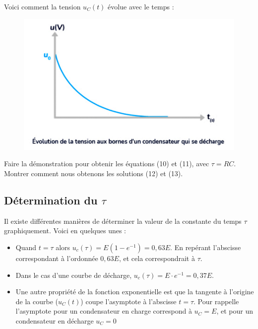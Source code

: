 \documentclass[11pt,a4paper]{article}
\begin{document}
Voici comment la tension $u_C(t)$ évolue avec le temps : 

\begin{figure}[H]
    \centering
    \includegraphics[width=0.7\linewidth]{imgs/p7/courbeDecharge.png.jpg}
\end{figure}

\begin{exo}   %
Faire la démonstration pour obtenir les équations (10) et (11), avec $\tau = RC$. Montrer comment nous obtenons les solutions (12) et (13). 
\vspace{10cm}
\end{exo}

\subsection{Détermination du $\tau$}

Il existe différentes manières de déterminer la valeur de la constante du temps $\tau$ graphiquement. Voici en quelques unes : 
\begin{itemize}
    \item Quand $t=\tau$ alors $u_c(\tau) = E\left(1-e^{-1}\right) = 0,63E$. En repérant l'abscisse correspondant à l'ordonnée $0,63E$, et cela correspondrait à $\tau$. 
    \item Dans le cas d'une courbe de décharge, $u_c(\tau) = E\cdot e^{-1} = 0,37E$.
    \item Une autre propriété de la fonction exponentielle est que la tangente à l'origine de la courbe ($u_C(t)$) coupe l'asymptote à l'abscisse $t=\tau$. Pour rappelle l'asymptote pour un condensateur en charge correspond à $u_C = E$, et pour un condensateur en décharge $u_C = 0$
\end{itemize}
\end{document}
